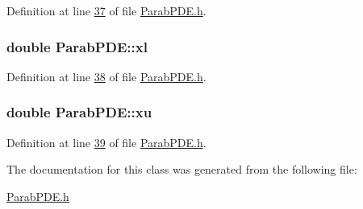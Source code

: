 Definition at line \hyperlink{ParabPDE_8h_source_l00037}{37} of file \hyperlink{ParabPDE_8h_source}{Parab\+P\+D\+E.\+h}.

\hypertarget{classParabPDE_aa75c941c87400c92781c74e1e4f5ae5e}{
\subsubsection[{xl}]{\setlength{\rightskip}{0pt plus 5cm}double Parab\+P\+D\+E\+::xl}}\label{classParabPDE_aa75c941c87400c92781c74e1e4f5ae5e}


Definition at line \hyperlink{ParabPDE_8h_source_l00038}{38} of file \hyperlink{ParabPDE_8h_source}{Parab\+P\+D\+E.\+h}.

\hypertarget{classParabPDE_a5e4f6911cba231072c0ed4b6b4462b8a}{
\subsubsection[{xu}]{\setlength{\rightskip}{0pt plus 5cm}double Parab\+P\+D\+E\+::xu}}\label{classParabPDE_a5e4f6911cba231072c0ed4b6b4462b8a}


Definition at line \hyperlink{ParabPDE_8h_source_l00039}{39} of file \hyperlink{ParabPDE_8h_source}{Parab\+P\+D\+E.\+h}.



The documentation for this class was generated from the following file\+:\begin{DoxyCompactItemize}
\item 
\hyperlink{ParabPDE_8h}{Parab\+P\+D\+E.\+h}\end{DoxyCompactItemize}
